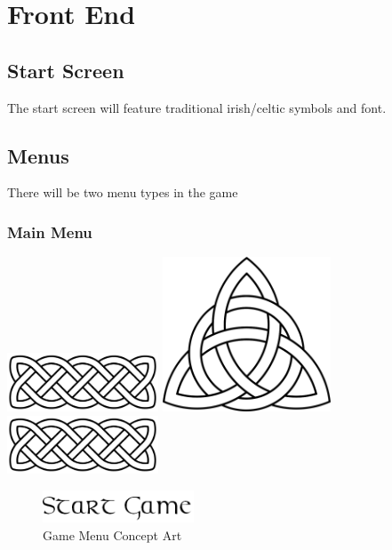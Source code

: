 \documentclass[a4paper]{scrreprt}
\begin{document}
    \chapter{Front End}
    
    \section{Start Screen}

    The start screen will feature traditional irish/celtic symbols and font.
    
    \section{Menus}

    There will be two menu types in the game

        \subsection{Main Menu}

        \begin{center}
            \includegraphics[width=4.5cm]{celtic-knot}
            \includegraphics[width=5cm]{celtic-knot-arrow}
            \includegraphics[width=4.5cm]{celtic-knot}
            \begin{figure}[H]
                \centering
                \includegraphics[width=4.5cm]{start-game}
                \caption{\label{fig:art} Game Menu Concept Art}
            \end{figure}
        \end{center}
\end{document}
